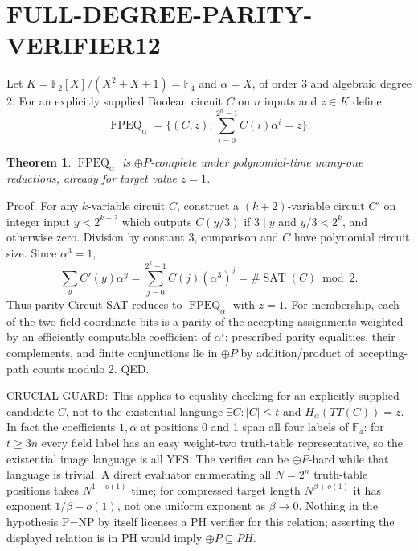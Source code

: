 \documentclass[11pt]{article}
\newtheorem{theorem}{Theorem}
\begin{document}
\section*{FULL-DEGREE-PARITY-VERIFIER12}
Let $K=\mathbb F_2[X]/(X^2+X+1)=\mathbb F_4$ and $\alpha=X$, of order 3 and algebraic degree 2. For an explicitly supplied Boolean circuit $C$ on $n$ inputs and $z\in K$ define
\[
\operatorname{FPEQ}_{\alpha}=\{(C,z):\sum_{i=0}^{2^n-1}C(i)\alpha^i=z\}.
\]
\begin{theorem}
$\operatorname{FPEQ}_{\alpha}$ is $\oplus P$-complete under polynomial-time many-one reductions, already for target value $z=1$.
\end{theorem}
\noindent Proof. For any $k$-variable circuit $C$, construct a $(k+2)$-variable circuit $C'$ on integer input $y<2^{k+2}$ which outputs $C(y/3)$ if $3\mid y$ and $y/3<2^k$, and otherwise zero. Division by constant 3, comparison and $C$ have polynomial circuit size. Since $\alpha^3=1$,
\[
\sum_y C'(y)\alpha^y=\sum_{j=0}^{2^k-1}C(j)(\alpha^3)^j=\#\operatorname{SAT}(C)\bmod2.
\]
Thus parity-Circuit-SAT reduces to $\operatorname{FPEQ}_\alpha$ with $z=1$. For membership, each of the two field-coordinate bits is a parity of the accepting assignments weighted by an efficiently computable coefficient of $\alpha^i$; prescribed parity equalities, their complements, and finite conjunctions lie in $\oplus P$ by addition/product of accepting-path counts modulo 2. QED.

\noindent CRUCIAL GUARD: This applies to equality checking for an explicitly supplied candidate $C$, not to the existential language $\exists C:|C|\le t$ and $H_\alpha(TT(C))=z$. In fact the coefficients $1,\alpha$ at positions 0 and 1 span all four labels of $\mathbb F_4$: for $t\ge3n$ every field label has an easy weight-two truth-table representative, so the existential image language is all YES. The verifier can be $\oplus P$-hard while that language is trivial. A direct evaluator enumerating all $N=2^n$ truth-table positions takes $N^{1-o(1)}$ time; for compressed target length $N^{\beta+o(1)}$ it has exponent $1/\beta-o(1)$, not one uniform exponent as $\beta\to0$. Nothing in the hypothesis P=NP by itself licenses a PH verifier for this relation; asserting the displayed relation is in PH would imply $\oplus P\subseteq PH$.
\end{document}

